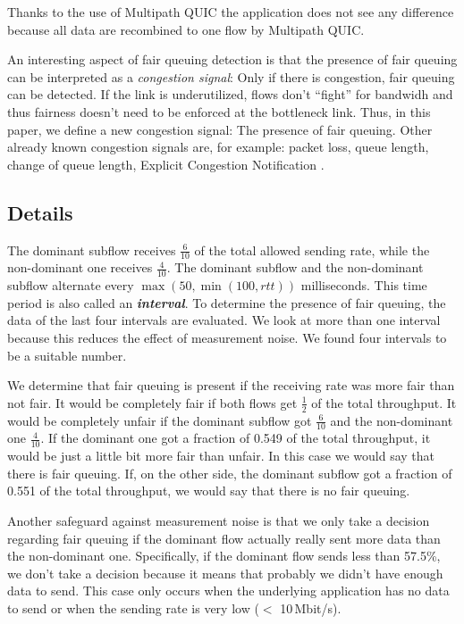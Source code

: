 \documentclass[conference]{IEEEtran}
\begin{document}
Thanks to the use of Multipath QUIC \cite{liu_multipath_2022} the application does not see any difference because all data are recombined to one flow by Multipath QUIC. 

An interesting aspect of fair queuing detection is that the presence of fair queuing can be interpreted as a \textit{congestion signal}: 
Only if there is congestion, fair queuing can be detected. If the link is underutilized, flows don't ``fight'' for bandwidh and thus fairness doesn't need to be enforced at the bottleneck link. 
Thus, in this paper, we define a new congestion signal: The presence of fair queuing. Other already known congestion signals are, for example: 
packet loss, queue length, change of queue length, Explicit Congestion Notification \cite{mathis_relentless_2009,hayes_revisiting_2011}. 

\subsection{Details}

The dominant subflow receives $\frac{6}{10}$ of the total allowed sending rate, while the non-dominant one receives $\frac{4}{10}$. 
The dominant subflow and the non-dominant subflow alternate every $\max{(50, \min{(100, \textit{rtt})})}$ milliseconds. 
This time period is also called an \textbf{\textit{interval}}. To determine the presence of fair queuing, the data of the last four intervals are evaluated. 
We look at more than one interval because this reduces the effect of measurement noise. We found four intervals to be a suitable number. 

We determine that fair queuing is present if the receiving rate was more fair than not fair. 
It would be completely fair if both flows get $\frac{1}{2}$ of the total throughput. It would be completely unfair if the dominant subflow got $\frac{6}{10}$ and the non-dominant one $\frac{4}{10}$. 
If the dominant one got a fraction of 0.549 of the total throughput, it would be just a little bit more fair than unfair. In this case we would say that there is fair queuing. 
If, on the other side, the dominant subflow got a fraction of 0.551 of the total throughput, we would say that there is no fair queuing. 

Another safeguard against measurement noise is that we only take a decision regarding fair queuing if the dominant flow actually really sent more data than the non-dominant one. 
Specifically, if the dominant flow sends less than 57.5\%, we don't take a decision because it means that probably we didn't have enough data to send. 
This case only occurs when the underlying application has no data to send or when the sending rate is very low ($<$ 10\,Mbit/s). 
\end{document}
